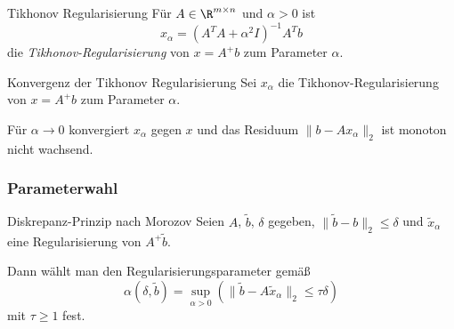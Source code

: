 \begin{defi}{Tikhonov Regularisierung}
    Für $A \in \R^{m \times n}$ und $\alpha > 0$ ist
    \[
        x_\alpha = (A^TA + \alpha^2 I)^{-1} A^T b
    \]
    die \emph{Tikhonov-Regularisierung} von $x = A^+ b$ zum Parameter $\alpha$.
\end{defi}

\begin{bonus}{Konvergenz der Tikhonov Regularisierung}
    Sei $x_\alpha$ die Tikhonov-Regularisierung von $x = A^+ b$ zum Parameter $\alpha$.

    Für $\alpha \to 0$ konvergiert $x_\alpha$ gegen $x$ und das Residuum $\|b - A x_\alpha\|_2$ ist monoton nicht wachsend.
\end{bonus}

\subsubsection{Parameterwahl}

\begin{bonus}{Diskrepanz-Prinzip nach Morozov}
    Seien $A$, $\tilde{b}$, $\delta$ gegeben, $\|\tilde{b} - b\|_2 \leq \delta$ und $\tilde{x}_\alpha$ eine Regularisierung von $A^+ \tilde{b}$.

    Dann wählt man den Regularisierungsparameter gemäß
    \[
        \alpha(\delta, \tilde{b}) = \sup_{\alpha > 0} \left( \|\tilde{b} - A \tilde{x}_\alpha\|_2 \leq \tau \delta \right)
    \]
    mit $\tau \geq 1$ fest.
\end{bonus}

